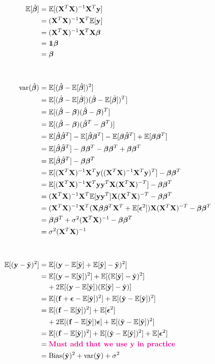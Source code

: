 \begin{align*}
    \fv{\hat{\bet}} & = \fv{(\mathbf{X}^T\mathbf{X})^{-1}\mathbf{X}^T \y} \\ 
    & = (\mathbf{X}^T\mathbf{X})^{-1}\mathbf{X}^T \fv{\y} \\ 
    & = (\mathbf{X}^T\mathbf{X})^{-1}\mathbf{X}^T \mathbf{X}\bet \\
    & = \unit \bet \\
    & = \bet 
    &  \\
    &  \\
    &  \\
    \text{var}(\hat{\bet}) & = \fv{(\hat{\bet}-\fv{\hat{\bet}})^2} \\
    & = \fv{(\hat{\bet}-\fv{\hat{\bet}})(\hat{\bet}-\fv{\hat{\bet}})^T} \\ 
    & = \fv{(\hat{\bet}-\bet)(\hat{\bet}-\bet)^T} \\ 
    & = \fv{(\hat{\bet}-\bet)(\hat{\bet}^T-\bet^T)} \\
    & = \fv{\hat{\bet}\hat{\bet}^T} - \fv{\hat{\bet}\bet^T} - \fv{\bet \hat{\bet}^T} + \fv{\bet \bet^T} \\
    & = \fv{\hat{\bet}\hat{\bet}^T} - \bet\bet^T - \bet\bet^T + \bet\bet^T \\
    & = \fv{\hat{\bet}\hat{\bet}^T} - \bet\bet^T \\
    & = \fv{\betta(\betta)^T} - \bet\bet^T \\
    & = \fv{\betta \y^T \mathbf{X}(\mathbf{X}^T\mathbf{X})^{-T}} - \bet\bet^T \\
    & = (\mathbf{X}^T\mathbf{X})^{-1}\mathbf{X}^T\fv{\y\y^T}\mathbf{X}(\mathbf{X}^T\mathbf{X})^{-T} - \bet\bet^T \\
    & = (\mathbf{X}^T\mathbf{X})^{-1}\mathbf{X}^T(\mathbf{X}\bet \bet^T \mathbf{X}^T + \fv{\boldsymbol{\epsilon}^2})\mathbf{X}(\mathbf{X}^T\mathbf{X})^{-T} - \bet\bet^T \\
    & = \bet \bet^T + \sigma^2 (\mathbf{X}^T\mathbf{X})^{-1} - \bet \bet^T \\
    & = \sigma^2 (\mathbf{X}^T\mathbf{X})^{-1}
    &  \\
    &  \\
    &  \\
    \fv{(\mathbf{y}-\yt)^2} & = \fv{(\mathbf{y} - \fv{\yt} + \fv{\yt} -\yt)^2} \\
    & = \fv{(\mathbf{y} - \fv{\yt})^2} + \fv{(\fv{\yt} -\yt)^2} \\
    & \;\;\;\; + 2\fv{(\mathbf{y} - \fv{\yt})(\fv{\yt} -\yt)} \\
    & = \fv{(\mathbf{f} + \boldsymbol{\epsilon} - \fv{\yt})^2} + \fv{(\yt - \fv{\yt})^2} \\
    & = \fv{(\mathbf{f}-\fv{\yt})^2}+\fv{\boldsymbol{\epsilon}^2} \\
    & \;\;\;\; + 2\fv{(\mathbf{f}-\fv{\yt})\boldsymbol{\epsilon}} + \fv{(\yt - \fv{\yt})^2}  \\
    & = \fv{(\mathbf{f}-\fv{\yt})^2} + \fv{(\yt - \fv{\yt})^2} +\fv{\boldsymbol{\epsilon}^2}\\
    & = \mia{Must add that we use y in practice} \\
    & = \text{Bias}(\yt)^2 + \text{var}(\yt) + \sigma^2
\end{align*}

